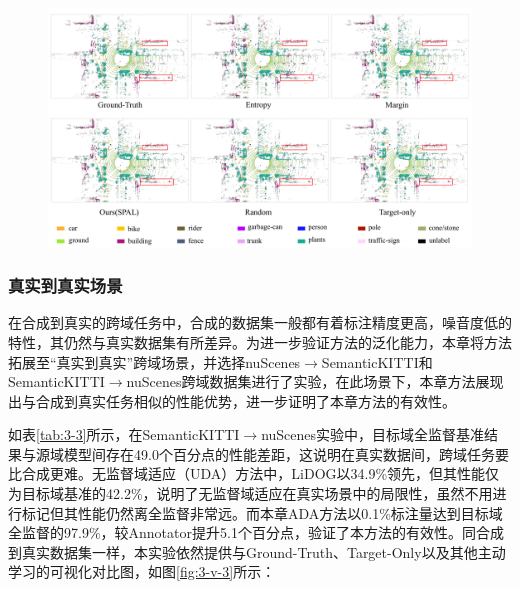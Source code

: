 \vspace{-0.1cm}
\begin{figure}[H]
    \centering
    \includegraphics[width = \textwidth]{ljx/figure/3_vision_s2p.pdf}
    \label{fig:3-v-2}
\end{figure}
\vspace{-0.35cm}

\subsubsection{真实到真实场景}
在合成到真实的跨域任务中，合成的数据集一般都有着标注精度更高，噪音度低的特性，其仍然与真实数据集有所差异。为进一步验证方法的泛化能力，本章将方法拓展至“真实到真实”跨域场景，并选择nuScenes\(\to\)SemanticKITTI和SemanticKITTI\(\to\)nuScenes跨域数据集进行了实验，在此场景下，本章方法展现出与合成到真实任务相似的性能优势，进一步证明了本章方法的有效性。

如表\ref{tab:3-3}所示，在SemanticKITTI$\to$nuScenes实验中，目标域全监督基准结果与源域模型间存在49.0个百分点的性能差距，这说明在真实数据间，跨域任务要比合成更难。无监督域适应（UDA）方法中，LiDOG以34.9\%领先，但其性能仅为目标域基准的42.2\%，说明了无监督域适应在真实场景中的局限性，虽然不用进行标记但其性能仍然离全监督非常远。而本章ADA方法以0.1\%标注量达到目标域全监督的97.9\%，较Annotator提升5.1个百分点，验证了本方法的有效性。同合成到真实数据集一样，本实验依然提供与Ground-Truth、Target-Only以及其他主动学习的可视化对比图，如图\ref{fig:3-v-3}所示：
\vspace{0.1cm}


